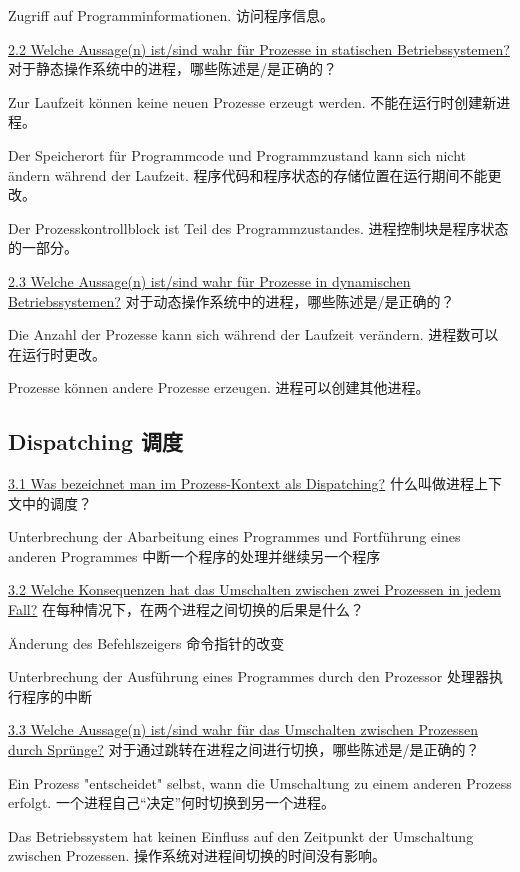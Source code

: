 \documentclass[fleqn]{article}
\begin{document}
Zugriff auf Programminformationen. 访问程序信息。

\noindent\uline{2.2 Welche Aussage(n) ist/sind wahr für Prozesse in statischen Betriebssystemen?} 对于静态操作系统中的进程，哪些陈述是/是正确的？

Zur Laufzeit können keine neuen Prozesse erzeugt werden.
不能在运行时创建新进程。

Der Speicherort für Programmcode und Programmzustand kann sich nicht ändern während der Laufzeit.
程序代码和程序状态的存储位置在运行期间不能更改。

Der Prozesskontrollblock ist Teil des Programmzustandes.
进程控制块是程序状态的一部分。

\noindent\uline{2.3 Welche Aussage(n) ist/sind wahr für Prozesse in dynamischen Betriebssystemen?}
对于动态操作系统中的进程，哪些陈述是/是正确的？

Die Anzahl der Prozesse kann sich während der Laufzeit verändern.
进程数可以在运行时更改。

Prozesse können andere Prozesse erzeugen.
进程可以创建其他进程。

\subsection{Dispatching 调度}

\noindent\uline{3.1 Was bezeichnet man im Prozess-Kontext als Dispatching?}
什么叫做进程上下文中的调度？

Unterbrechung der Abarbeitung eines Programmes und Fortführung eines anderen Programmes
中断一个程序的处理并继续另一个程序

\noindent\uline{3.2 Welche Konsequenzen hat das Umschalten zwischen zwei Prozessen in jedem Fall?}
在每种情况下，在两个进程之间切换的后果是什么？

Änderung des Befehlszeigers
命令指针的改变

Unterbrechung der Ausführung eines Programmes durch den Prozessor
处理器执行程序的中断

\noindent\uline{3.3 Welche Aussage(n) ist/sind wahr für das Umschalten zwischen Prozessen durch Sprünge?}
对于通过跳转在进程之间进行切换，哪些陈述是/是正确的？

Ein Prozess "entscheidet" selbst, wann die Umschaltung zu einem anderen Prozess erfolgt.
一个进程自己“决定”何时切换到另一个进程。

Das Betriebssystem hat keinen Einfluss auf den Zeitpunkt der Umschaltung zwischen Prozessen.
操作系统对进程间切换的时间没有影响。
\end{document}
